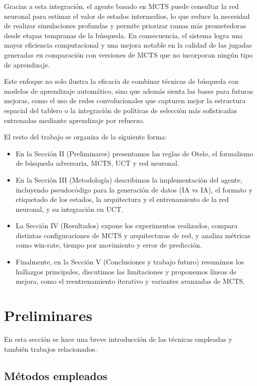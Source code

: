 \documentclass[conference,a4paper]{IEEEtran}
\begin{document}
Gracias a esta integración, el agente basado en MCTS puede consultar la red neuronal para estimar el valor de estados intermedios, lo que reduce la necesidad de realizar simulaciones profundas y permite priorizar ramas más prometedoras desde etapas tempranas de la búsqueda. En consecuencia, el sistema logra una mayor eficiencia computacional y una mejora notable en la calidad de las jugadas generadas en comparación con versiones de MCTS que no incorporan ningún tipo de aprendizaje.

Este enfoque no solo ilustra la eficacia de combinar técnicas de búsqueda con modelos de aprendizaje automático, sino que además sienta las bases para futuras mejoras, como el uso de redes convolucionales que capturen mejor la estructura espacial del tablero o la integración de políticas de selección más sofisticadas entrenadas mediante aprendizaje por refuerzo.

El resto del trabajo se organiza de la siguiente forma:
\begin{itemize}
    \item En la Sección II (Preliminares) presentamos las reglas de Otelo, el formalismo de búsqueda adversaria, MCTS, UCT y red neuronal.
    \item En la Sección III (Metodología) describimos la implementación del agente, incluyendo pseudocódigo para la generación de datos (IA vs IA), el formato y etiquetado de los estados, la arquitectura y el entrenamiento de la red neuronal, y su integración en UCT.
    \item La Sección IV (Resultados) expone los experimentos realizados, compara distintas configuraciones de MCTS y arquitecturas de red, y analiza métricas como win-rate, tiempo por movimiento y error de predicción.
    \item Finalmente, en la Sección V (Conclusiones y trabajo futuro) resumimos los hallazgos principales, discutimos las limitaciones y proponemos líneas de mejora, como el reentrenamiento iterativo y variantes avanzadas de MCTS.
\end{itemize}

\section{Preliminares}

En esta sección se hace una breve introducción de las técnicas empleadas y también trabajos relacionados.

\subsection{Métodos empleados}
\end{document}
